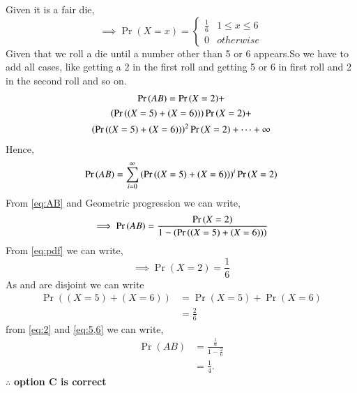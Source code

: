 \documentclass[journal,12pt,twocolumn]{IEEEtran}
\begin{document}
Given it is a fair die,
\begin{equation}
    \implies \Pr(X=x)=
    \begin{cases}
    \frac{1}{6} & 1 \leq x \leq 6\\
    0 & otherwise
    \end{cases}
    \label{eq:pdf}
\end{equation}
Given that we roll a die until a number other than 5 or 6 appears.So we have to add all cases, like getting a 2 in the first roll and getting 5 or 6 in first roll and 2 in the second roll and so on.
\begin{multline}
    \Pr{(AB)}=\Pr{(X=2)}+\\\left(\Pr{((X=5)+(X=6))}\right)\Pr{(X=2)}+\\\left(\Pr{((X=5)+(X=6))}\right)^{2}\Pr{(X=2)}+\cdots+\infty \label{eq:AB}
\end{multline}
Hence,
\begin{equation}
    \Pr{(AB)}=\sum_{i=0}^{\infty} \left(\Pr{((X=5)+(X=6))}\right)^{i}\Pr{(X=2)}
\end{equation}
From \eqref{eq:AB} and Geometric progression we can write,
\begin{equation}
    \implies \Pr{(AB)}=\frac{\Pr{(X=2)}}{1-\left(\Pr{((X=5)+(X=6))}\right)}
\end{equation}
From \eqref{eq:pdf} we can write,
\begin{equation}
    \implies \Pr{(X=2)}=\frac{1}{6} \label{eq:2}
\end{equation}
As  and  are disjoint we can write
\begin{align}
    \Pr{((X=5)+(X=6))}&=\Pr{(X=5)}+\Pr{(X=6)}\\
    &=\frac{2}{6}\label{eq:5,6}
\end{align}
from \eqref{eq:2} and \eqref{eq:5,6} we can write,
\begin{align}
    \Pr{(AB)}&=\frac{\frac{1}{6}}{1-\frac{2}{6}}\\
    &=\frac{1}{4}.
\end{align}
$\therefore$ \textbf{option C is correct}
\end{document}
